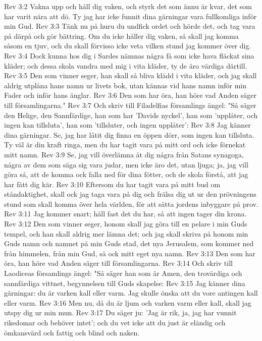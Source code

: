 Rev 3:2  Vakna upp och håll dig vaken, och styrk det som ännu är kvar, det som har varit nära att dö. Ty jag har icke funnit dina gärningar vara fullkomliga inför min Gud.
Rev 3:3  Tänk nu på huru du undfick ordet och hörde det, och tag vara på därpå och gör bättring. Om du icke håller dig vaken, så skall jag komma såsom en tjuv, och du skall förvisso icke veta vilken stund jag kommer över dig.
Rev 3:4  Dock kunna hos dig i Sardes nämnas några få som icke hava fläckat sina kläder; och dessa skola vandra med mig i vita kläder, ty de äro värdiga därtill.
Rev 3:5  Den som vinner seger, han skall så bliva klädd i vita kläder, och jag skall aldrig utplåna hans namn ur livets bok, utan kännas vid hans namn inför min Fader och inför hans änglar.
Rev 3:6  Den som har öra, han höre vad Anden säger till församlingarna."
Rev 3:7  Och skriv till Filadelfias församlings ängel: "Så säger den Helige, den Sannfärdige, han som har 'Davids nyckel', han som 'upplåter, och ingen kan tillsluta', han som 'tillsluter, och ingen upplåter':
Rev 3:8  Jag känner dina gärningar. Se, jag har låtit dig finna en öppen dörr, som ingen kan tillsluta. Ty väl är din kraft ringa, men du har tagit vara på mitt ord och icke förnekat mitt namn.
Rev 3:9  Se, jag vill överlämna åt dig några från Satans synagoga, några av dem som säga sig vara judar, men icke äro det, utan ljuga; ja, jag vill göra så, att de komma ock falla ned för dina fötter, och de skola förstå, att jag har fått dig kär.
Rev 3:10  Eftersom du har tagit vara på mitt bud om ståndaktighet, skall ock jag taga vara på dig och frälsa dig ut ur den prövningens stund som skall komma över hela världen, för att sätta jordens inbyggare på prov.
Rev 3:11  Jag kommer snart; håll fast det du har, så att ingen tager din krona.
Rev 3:12  Den som vinner seger, honom skall jag göra till en pelare i min Guds tempel, och han skall aldrig mer lämna det; och jag skall skriva på honom min Guds namn och namnet på min Guds stad, det nya Jerusalem, som kommer ned från himmelen, från min Gud, så ock mitt eget nya namn.
Rev 3:13  Den som har öra, han höre vad Anden säger till församlingarna.
Rev 3:14  Och skriv till Laodiceas församlings ängel: "Så säger han som är Amen, den trovärdiga och sannfärdiga vittnet, begynnelsen till Guds skapelse:
Rev 3:15  Jag känner dina gärningar: du är varken kall eller varm. Jag skulle önska att du vore antingen kall eller varm.
Rev 3:16  Men nu, då du är ljum och varken varm eller kall, skall jag utspy dig ur min mun.
Rev 3:17  Du säger ju: 'Jag är rik, ja, jag har vunnit rikedomar och behöver intet'; och du vet icke att du just är eländig och ömkansvärd och fattig och blind och naken.

